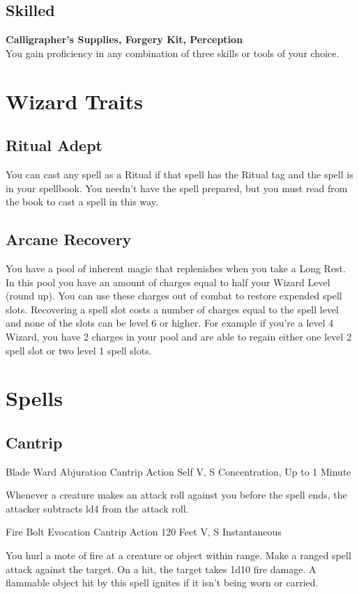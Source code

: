 \documentclass[letterpaper,openany,oneside,twocolumn]{book}
\begin{document}
\subsection*{Skilled}
\textbf{Calligrapher's Supplies, Forgery Kit, Perception}\\
You gain proficiency in any combination of three skills or tools of your choice. 

\section*{Wizard Traits}
\subsection*{Ritual Adept}
You can cast any spell as a Ritual if that spell has the Ritual tag and the spell is in your spellbook. You needn't have the spell prepared, but you must read from the book to cast a spell in this way. 
\subsection*{Arcane Recovery}
You have a pool of inherent magic that replenishes when you take a Long Rest. In this pool you have an amount of charges equal to half your Wizard Level (round up). You can use these charges out of combat to restore expended spell slots. Recovering a spell slot costs a number of charges equal to the spell level and none of the slots can be level 6 or higher. For example if you're a level 4 Wizard, you have 2 charges in your pool and are able to regain either one level 2 spell slot or two level 1 spell slots. 

\section*{Spells}
\subsection*{Cantrip}

\DndSpellHeader
  {Blade Ward}
  {Abjuration Cantrip}
  {Action}
  {Self}
  {V, S}
  {Concentration, Up to 1 Minute}

Whenever a creature makes an attack roll against you before the spell ends, the attacker subtracts ld4 from the attack roll.

\DndSpellHeader
  {Fire Bolt}
  {Evocation Cantrip}
  {Action}
  {120 Feet}
  {V, S}
  {Instantaneous}

You hurl a mote of fire at a creature or object within range. Make a ranged spell attack against the target. On a hit, the target takes 1d10 fire damage. A flammable object hit by this spell ignites if it isn't being worn or carried.
\end{document}
